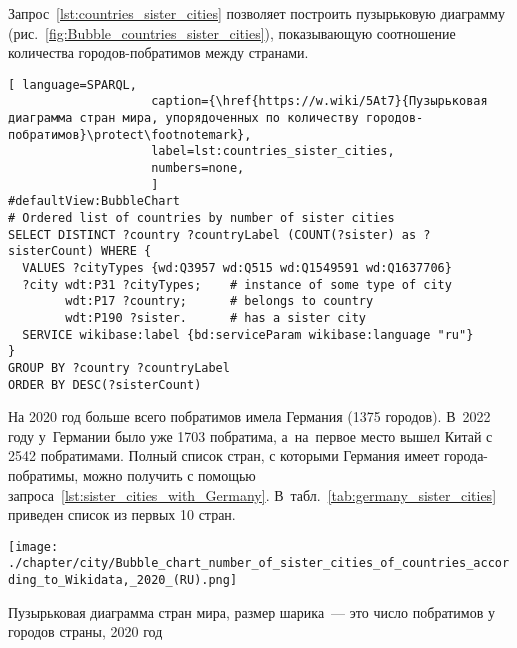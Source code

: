 Запрос~\ref{lst:countries_sister_cities} позволяет построить 
пузырьковую диаграмму (рис.~\ref{fig:Bubble_countries_sister_cities}), 
показывающую соотношение количества городов-побратимов между странами.

\begin{lstlisting}[ language=SPARQL, 
                    caption={\href{https://w.wiki/5At7}{Пузырьковая диаграмма стран мира, упорядоченных по количеству городов-побратимов}\protect\footnotemark},
                    label=lst:countries_sister_cities,
                    numbers=none,
                    ]
#defaultView:BubbleChart
# Ordered list of countries by number of sister cities
SELECT DISTINCT ?country ?countryLabel (COUNT(?sister) as ?sisterCount) WHERE {
  VALUES ?cityTypes {wd:Q3957 wd:Q515 wd:Q1549591 wd:Q1637706}
  ?city wdt:P31 ?cityTypes;    # instance of some type of city
        wdt:P17 ?country;      # belongs to country
        wdt:P190 ?sister.      # has a sister city
  SERVICE wikibase:label {bd:serviceParam wikibase:language "ru"}
}
GROUP BY ?country ?countryLabel
ORDER BY DESC(?sisterCount)
\end{lstlisting}

На 2020 год больше всего побратимов имела Германия (\num{1375} городов). 
В~2022 году у~Германии было уже 1703 побратима, 
а~на~первое место вышел Китай с 2542 побратимами. 
Полный список стран, с которыми Германия имеет города-побратимы, можно получить с помощью запроса~\ref{lst:sister_cities_with_Germany}. 
В~табл.~\ref{tab:germany_sister_cities} приведен список из первых 10 стран.
%
\begin{marginfigure}[-1.5cm]
    \texttt{[image: ./chapter/city/Bubble\_chart\_number\_of\_sister\_cities\_of\_countries\_according\_to\_Wikidata,\_2020\_(RU).png]}
\caption[Пузырьковая диаграмма стран мира по числу побратимов у городов, 2020 год.]{Пузырьковая диаграмма стран мира, размер шарика~--- это число \mbox{побратимов} у городов страны, 2020 год}%
  \label{fig:Bubble_countries_sister_cities}%
\end{marginfigure}



